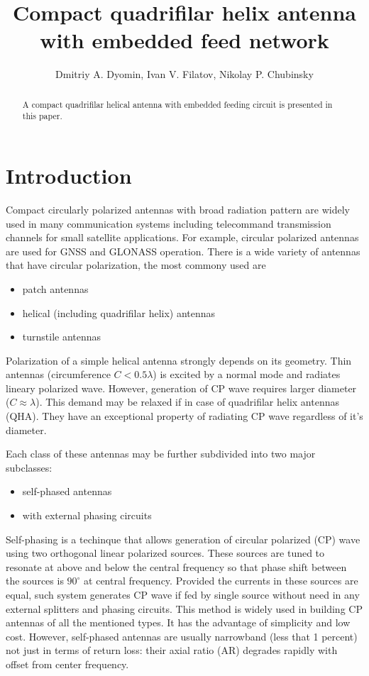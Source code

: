 \documentclass{IEEEtran}
\begin{document}
\title{Compact quadrifilar helix antenna with embedded feed network}
\author{Dmitriy A. Dyomin, Ivan V. Filatov, Nikolay P. Chubinsky}
\maketitle
\begin{abstract}
  A compact quadrifilar helical antenna with embedded feeding circuit
  is presented in this paper.
\end{abstract}

\section{Introduction}
\label{sec:introduction}
Compact circularly polarized antennas with broad radiation pattern are widely used in many
communication systems including telecommand transmission channels for small satellite
applications. For example, circular polarized antennas are used for GNSS and GLONASS
operation. There is a wide variety of antennas that have circular polarization, the most commony
used are

\begin{itemize}
\item patch antennas
\item helical (including quadrifilar helix) antennas
\item turnstile antennas
\end{itemize}

Polarization of a simple helical antenna strongly depends on its geometry. Thin antennas
(circumference $C < 0.5 \lambda$) is excited by a normal mode and radiates lineary polarized
wave. However, generation of CP wave requires larger diameter ($C \approx \lambda$). This demand may
be relaxed if in case of quadrifilar helix antennas (QHA). They have an exceptional property of
radiating CP wave regardless of it's diameter.

Each class of these antennas may be further subdivided into two major subclasses:
\begin{itemize}
\item self-phased antennas
\item with external phasing circuits
\end{itemize}

Self-phasing is a techinque that allows generation of circular polarized (CP) wave using two
orthogonal linear polarized sources. These sources are tuned to resonate at above and below the
central frequency so that phase shift between the sources is $90^{\circ}$ at central
frequency. Provided the currents in these sources are equal, such system generates CP wave if fed by
single source without need in any external splitters and phasing circuits. This method is widely
used in building CP antennas of all the mentioned types. It has the advantage of simplicity and low
cost. However, self-phased antennas are usually narrowband (less that 1 percent) not just in terms
of return loss: their axial ratio (AR) degrades rapidly with offset from center frequency.
\end{document}
